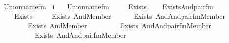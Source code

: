 \begin{isabellebody}
\isanewline
{}\isamarkupfalse%
\ Union{\isacharunderscore}{\kern0pt}name{\isacharunderscore}{\kern0pt}fm\ {\isacharcolon}{\kern0pt}{\isacharcolon}{\kern0pt}\ {\isachardoublequoteopen}i{\isachardoublequoteclose}\ \isanewline
\ \ {\isachardoublequoteopen}Union{\isacharunderscore}{\kern0pt}name{\isacharunderscore}{\kern0pt}fm\ {\isasymequiv}\isanewline
\ \ \ \ Exists{\isacharparenleft}{\kern0pt}\isanewline
\ \ \ \ Exists{\isacharparenleft}{\kern0pt}And{\isacharparenleft}{\kern0pt}pair{\isacharunderscore}{\kern0pt}fm{\isacharparenleft}{\kern0pt}{}{\isacharcomma}{\kern0pt}{}{\isacharcomma}{\kern0pt}{}{\isacharparenright}{\kern0pt}{\isacharcomma}{\kern0pt}\isanewline
\ \ \ \ Exists\ {\isacharparenleft}{\kern0pt}\isanewline
\ \ \ \ Exists\ {\isacharparenleft}{\kern0pt}And{\isacharparenleft}{\kern0pt}Member{\isacharparenleft}{\kern0pt}{}{\isacharcomma}{\kern0pt}{}{\isacharparenright}{\kern0pt}{\isacharcomma}{\kern0pt}\isanewline
\ \ \ \ \ \ Exists\ {\isacharparenleft}{\kern0pt}And{\isacharparenleft}{\kern0pt}And{\isacharparenleft}{\kern0pt}pair{\isacharunderscore}{\kern0pt}fm{\isacharparenleft}{\kern0pt}{}{\isacharcomma}{\kern0pt}{}{\isacharcomma}{\kern0pt}{}{\isacharparenright}{\kern0pt}{\isacharcomma}{\kern0pt}Member{\isacharparenleft}{\kern0pt}{}{\isacharcomma}{\kern0pt}{}{\isacharparenright}{\kern0pt}{\isacharparenright}{\kern0pt}{\isacharcomma}{\kern0pt}\isanewline
\ \ \ \ \ \ \ \ Exists\ {\isacharparenleft}{\kern0pt}And{\isacharparenleft}{\kern0pt}Member{\isacharparenleft}{\kern0pt}{}{\isacharcomma}{\kern0pt}{}{\isacharparenright}{\kern0pt}{\isacharcomma}{\kern0pt}\isanewline
\ \ \ \ \ \ \ \ \ Exists\ {\isacharparenleft}{\kern0pt}And{\isacharparenleft}{\kern0pt}And{\isacharparenleft}{\kern0pt}pair{\isacharunderscore}{\kern0pt}fm{\isacharparenleft}{\kern0pt}{}{\isacharcomma}{\kern0pt}{}{\isacharcomma}{\kern0pt}{}{\isacharparenright}{\kern0pt}{\isacharcomma}{\kern0pt}Member{\isacharparenleft}{\kern0pt}{}{\isacharcomma}{\kern0pt}{}{\isacharparenright}{\kern0pt}{\isacharparenright}{\kern0pt}{\isacharcomma}{\kern0pt}\isanewline
\ \ \ \ \ \ \ \ \ \ Exists\ {\isacharparenleft}{\kern0pt}And{\isacharparenleft}{\kern0pt}And{\isacharparenleft}{\kern0pt}pair{\isacharunderscore}{\kern0pt}fm{\isacharparenleft}{\kern0pt}{}{\isacharcomma}{\kern0pt}{}{\isacharcomma}{\kern0pt}{}{\isacharparenright}{\kern0pt}{\isacharcomma}{\kern0pt}Member{\isacharparenleft}{\kern0pt}{}{\isacharcomma}{\kern0pt}{}{}{\isacharparenright}{\kern0pt}{\isacharparenright}{\kern0pt}{\isacharcomma}{\kern0pt}\isanewline

\end{isabellebody}
